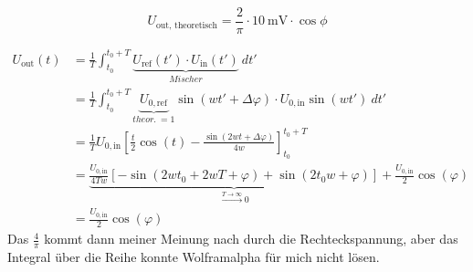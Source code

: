 \[U_\text{out, theoretisch} = \frac{2}{\pi}\cdot\SI{10}{\milli\volt}\cdot \cos\phi\]

\begin{align}
	U_\text{out}(t) &= \frac{1}{T}\int_{t_0}^{t_0+T}\underbrace{U_\text{ref}(t')\cdot U_\text{in}(t')}_{Mischer}\ dt' \\
	&= \frac{1}{T}\int_{t_0}^{t_0+T}\underbrace{U_{0,\text{ref}}}_{theor.\ = 1}\sin(wt'+\Delta\varphi)\cdot U_{0,\text{in}}\sin(wt')\ dt' \\
	&= \frac{1}{T}U_{0,\text{in}}\left[\frac{t}{2}\cos(t)-\frac{\sin(2wt+\Delta\varphi)}{4w}\right]_{t_0}^{t_0+T} \\
	&= \underbrace{\frac{U_{0,\text{in}}}{4Tw}\left[-\sin(2wt_0+2wT+\varphi)+\sin(2t_0w+\varphi)\right]}_{\overset{T\rightarrow\infty}{\longrightarrow} 0}+\frac{U_{0,\text{in}}}{2}\cos(\varphi) \\
	&= \frac{U_{0,\text{in}}}{2}\cos(\varphi)
\end{align}
Das $\frac{4}{\pi}$ kommt dann meiner Meinung nach durch die Rechteckspannung, aber das Integral über die Reihe konnte Wolframalpha für mich nicht lösen.